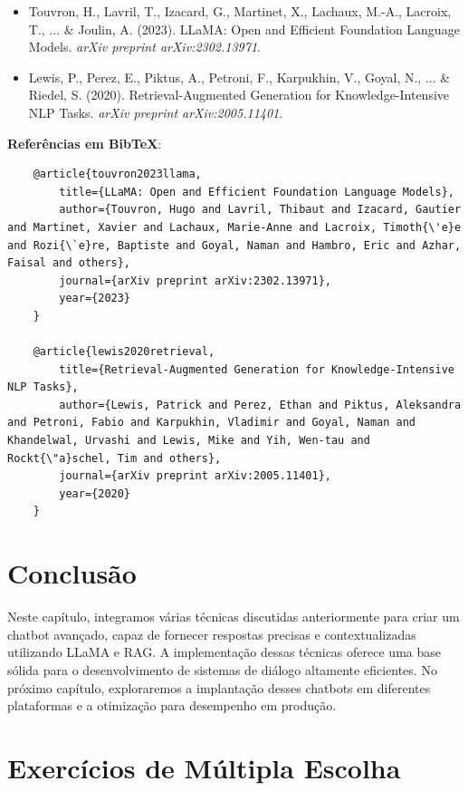 \documentclass[14pt,a4paper,oneside]{book}
\begin{document}
\begin{itemize}
	\item Touvron, H., Lavril, T., Izacard, G., Martinet, X., Lachaux, M.-A., Lacroix, T., ... \& Joulin, A. (2023). LLaMA: Open and Efficient Foundation Language Models. \textit{arXiv preprint arXiv:2302.13971}.
	\item Lewis, P., Perez, E., Piktus, A., Petroni, F., Karpukhin, V., Goyal, N., ... \& Riedel, S. (2020). Retrieval-Augmented Generation for Knowledge-Intensive NLP Tasks. \textit{arXiv preprint arXiv:2005.11401}.
\end{itemize}

\textbf{Referências em BibTeX}:

\begin{verbatim}
	@article{touvron2023llama,
		title={LLaMA: Open and Efficient Foundation Language Models},
		author={Touvron, Hugo and Lavril, Thibaut and Izacard, Gautier and Martinet, Xavier and Lachaux, Marie-Anne and Lacroix, Timoth{\'e}e and Rozi{\`e}re, Baptiste and Goyal, Naman and Hambro, Eric and Azhar, Faisal and others},
		journal={arXiv preprint arXiv:2302.13971},
		year={2023}
	}
	
	@article{lewis2020retrieval,
		title={Retrieval-Augmented Generation for Knowledge-Intensive NLP Tasks},
		author={Lewis, Patrick and Perez, Ethan and Piktus, Aleksandra and Petroni, Fabio and Karpukhin, Vladimir and Goyal, Naman and Khandelwal, Urvashi and Lewis, Mike and Yih, Wen-tau and Rockt{\"a}schel, Tim and others},
		journal={arXiv preprint arXiv:2005.11401},
		year={2020}
	}
\end{verbatim}

\section{Conclusão}

Neste capítulo, integramos várias técnicas discutidas anteriormente para criar um chatbot avançado, capaz de fornecer respostas precisas e contextualizadas utilizando LLaMA e RAG. A implementação dessas técnicas oferece uma base sólida para o desenvolvimento de sistemas de diálogo altamente eficientes. No próximo capítulo, exploraremos a implantação desses chatbots em diferentes plataformas e a otimização para desempenho em produção.

\section*{Exercícios de Múltipla Escolha}
\end{document}
